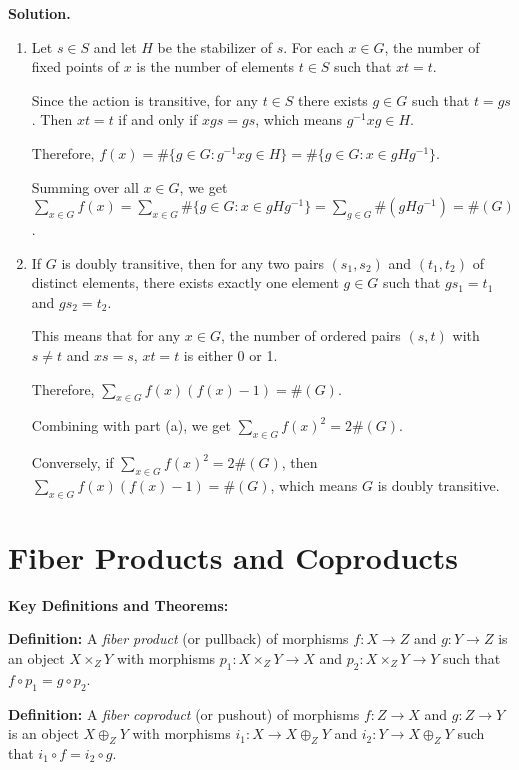 \noindent\textbf{Solution.}
\begin{enumerate}[label=(\alph*)]
\item Let $s \in S$ and let $H$ be the stabilizer of $s$. For each $x \in G$, the number of fixed points of $x$ is the number of elements $t \in S$ such that $xt = t$.

Since the action is transitive, for any $t \in S$ there exists $g \in G$ such that $t = gs$. Then $xt = t$ if and only if $xgs = gs$, which means $g^{-1}xg \in H$.

Therefore, $f(x) = \#\{g \in G : g^{-1}xg \in H\} = \#\{g \in G : x \in gHg^{-1}\}$.

Summing over all $x \in G$, we get $\sum_{x \in G} f(x) = \sum_{x \in G} \#\{g \in G : x \in gHg^{-1}\} = \sum_{g \in G} \#(gHg^{-1}) = \#(G)$.

\item If $G$ is doubly transitive, then for any two pairs $(s_1, s_2)$ and $(t_1, t_2)$ of distinct elements, there exists exactly one element $g \in G$ such that $gs_1 = t_1$ and $gs_2 = t_2$.

This means that for any $x \in G$, the number of ordered pairs $(s, t)$ with $s \neq t$ and $xs = s$, $xt = t$ is either 0 or 1.

Therefore, $\sum_{x \in G} f(x)(f(x)-1) = \#(G)$.

Combining with part (a), we get $\sum_{x \in G} f(x)^2 = 2\#(G)$.

Conversely, if $\sum_{x \in G} f(x)^2 = 2\#(G)$, then $\sum_{x \in G} f(x)(f(x)-1) = \#(G)$, which means $G$ is doubly transitive.
\end{enumerate}

\section{Fiber Products and Coproducts}

\textbf{Key Definitions and Theorems:}

\textbf{Definition:} A \textit{fiber product} (or pullback) of morphisms $f: X \to Z$ and $g: Y \to Z$ is an object $X \times_Z Y$ with morphisms $p_1: X \times_Z Y \to X$ and $p_2: X \times_Z Y \to Y$ such that $f \circ p_1 = g \circ p_2$.

\textbf{Definition:} A \textit{fiber coproduct} (or pushout) of morphisms $f: Z \to X$ and $g: Z \to Y$ is an object $X \oplus_Z Y$ with morphisms $i_1: X \to X \oplus_Z Y$ and $i_2: Y \to X \oplus_Z Y$ such that $i_1 \circ f = i_2 \circ g$.

